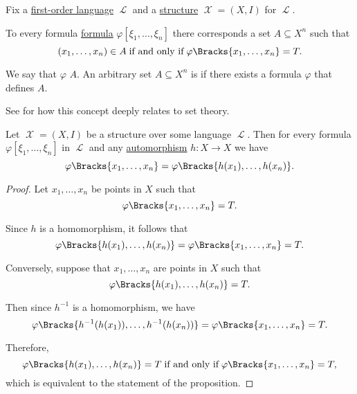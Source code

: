 \begin{definition}\label{def:first_order_definability}
  Fix a \hyperref[def:first_order_syntax]{first-order language} \( \mscrL \) and a \hyperref[def:first_order_structure]{structure} \( \mscrX = (X, I) \) for \( \mscrL \).

  To every formula \hyperref[def:first_order_syntax]{formula} \( \varphi[\xi_1, \ldots, \xi_n] \) there corresponds a set \( A \subseteq X^n \) such that
  \begin{equation*}
    (x_1, \ldots, x_n) \in A \T{if and only if} \varphi\Bracks{x_1, \ldots, x_n} = T.
  \end{equation*}

  We say that \( \varphi \)  \( A \). An arbitrary set \( A \subseteq X^n \) is  if there exists a formula \( \varphi \) that defines \( A \).

  See  for how this concept deeply relates to set theory.
\end{definition}

\begin{proposition}\label{thm:automorphism_preserves_validity}
  Let \( \mscrX = (X, I) \) be a structure over some language \( \mscrL \). Then for every formula \( \varphi[\xi_1, \ldots, \xi_n] \) in \( \mscrL \) and any \hyperref[def:first_order_homomorphism_invertibility/automorphism]{automorphism} \( h: X \to X \) we have
  \begin{equation*}
    \varphi\Bracks{x_1, \ldots, x_n} = \varphi\Bracks{h(x_1), \ldots, h(x_n)}.
  \end{equation*}
\end{proposition}
\begin{proof}
  Let \( x_1, \ldots, x_n \) be points in \( X \) such that
  \begin{equation*}
    \varphi\Bracks{x_1, \ldots, x_n} = T.
  \end{equation*}

  Since \( h \) is a homomorphism, it follows that
  \begin{equation*}
    \varphi\Bracks{h(x_1), \ldots, h(x_n)} = \varphi\Bracks{x_1, \ldots, x_n} = T.
  \end{equation*}

  Conversely, suppose that \( x_1, \ldots, x_n \) are points in \( X \) such that
  \begin{equation*}
    \varphi\Bracks{h(x_1), \ldots, h(x_n)} = T.
  \end{equation*}

  Then since \( h^{-1} \) is a homomorphism, we have
  \begin{equation*}
    \varphi\Bracks{h^{-1}(h(x_1)), \ldots, h^{-1}(h(x_n))}
    =
    \varphi\Bracks{x_1, \ldots, x_n}
    =
    T.
  \end{equation*}

  Therefore,
  \begin{equation*}
    \varphi\Bracks{h(x_1), \ldots, h(x_n)} = T \T{if and only if} \varphi\Bracks{x_1, \ldots, x_n} = T,
  \end{equation*}
  which is equivalent to the statement of the proposition.
\end{proof}

